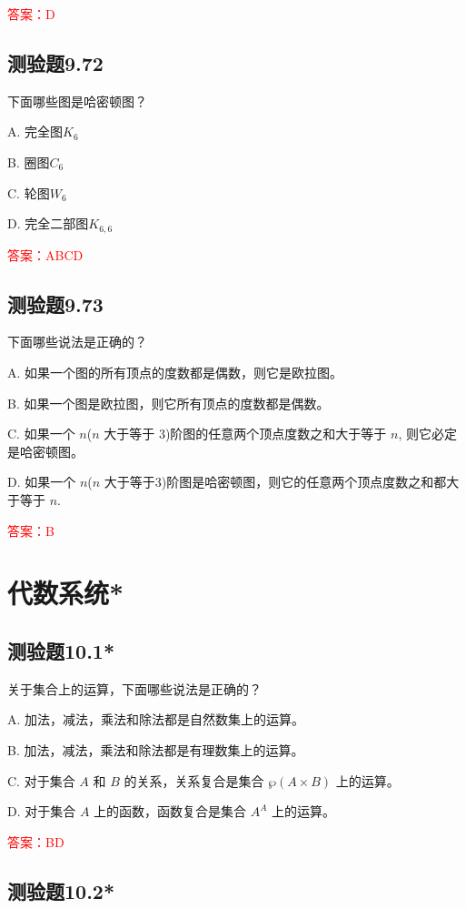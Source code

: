 \documentclass[UTF8, heading=true]{ctexart}
\begin{document}
\textcolor{red}{答案：D}

\subsection{测验题9.72}

下面哪些图是哈密顿图？

A. 完全图$K_6$

B. 圈图$C_6$

C. 轮图$W_6$

D. 完全二部图$K_{6,6}$

\textcolor{red}{答案：ABCD}

\subsection{测验题9.73}

下面哪些说法是正确的？

A. 
如果一个图的所有顶点的度数都是偶数，则它是欧拉图。

B. 
如果一个图是欧拉图，则它所有顶点的度数都是偶数。

C. 
如果一个 $n$($n$ 大于等于 3)阶图的任意两个顶点度数之和大于等于 $n$, 则它必定是哈密顿图。

D. 
如果一个 $n$($n$ 大于等于3)阶图是哈密顿图，则它的任意两个顶点度数之和都大于等于 $n$.

\textcolor{red}{答案：B}

\clearpage

\section{代数系统*}

\subsection{测验题10.1*}

关于集合上的运算，下面哪些说法是正确的？

A. 加法，减法，乘法和除法都是自然数集上的运算。

B. 加法，减法，乘法和除法都是有理数集上的运算。

C. 对于集合 $A$ 和 $B$ 的关系，关系复合是集合 $\wp(A \times B)$ 上的运算。

D. 对于集合 $A$ 上的函数，函数复合是集合 $A^A$ 上的运算。

\textcolor{red}{答案：BD}

\subsection{测验题10.2*}
\end{document}
